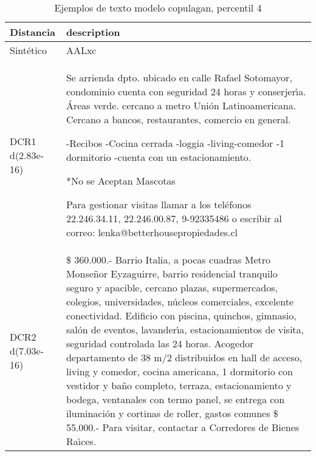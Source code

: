 \begin{table}[H]
\centering
\fontsize{10}{14}\selectfont
\caption{Ejemplos de texto modelo copulagan, percentil 4}
\label{table-example-economicos-b-2-copulagan-4p-text}
\begin{tabular}{|l|m{35em}|}
\hline
\rowcolor[gray]{0.8}
Distancia & description \\
\hline Sintético & AALxc \\
\hline DCR1 d(2.83e-16) & Se arrienda dpto. ubicado en calle Rafael Sotomayor, condominio cuenta con seguridad 24 horas y conserjer{\'\i}a. \'Areas verde.
cercano a metro Uni\'on Latinoamericana.
Cercano a bancos, restaurantes, comercio en general.

-Recibos
-Cocina cerrada
-loggia
-living-comedor
-1 dormitorio
-cuenta con un estacionamiento.

*No se Aceptan Mascotas

Para gestionar visitas llamar a los tel\'efonos 22.246.34.11, 22.246.00.87, 9-92335486 o escribir al correo: lenka@betterhousepropiedades.cl
 \\
\hline DCR2 d(7.03e-16) & \$ 360.000.- Barrio Italia, a pocas cuadras Metro Monse\~nor Eyzaguirre, barrio residencial tranquilo seguro y apacible, cercano plazas, supermercados, colegios, universidades, n\'ucleos comerciales, excelente conectividad.   Edificio con piscina, quinchos, gimnasio, sal\'on de eventos, lavander{\'\i}a, estacionamientos de visita, seguridad controlada las 24 horas.  Acogedor departamento de 38 m/2 distribuidos en hall de acceso, living y comedor,  cocina americana, 1 dormitorio con vestidor y ba\~no completo, terraza, estacionamiento y bodega, ventanales con termo panel, se entrega con iluminaci\'on y cortinas de roller, gastos comunes \$ 55.000.- Para visitar, contactar a Corredores de Bienes Ra{\'\i}ces. \\
\hline
\end{tabular}
\end{table}
